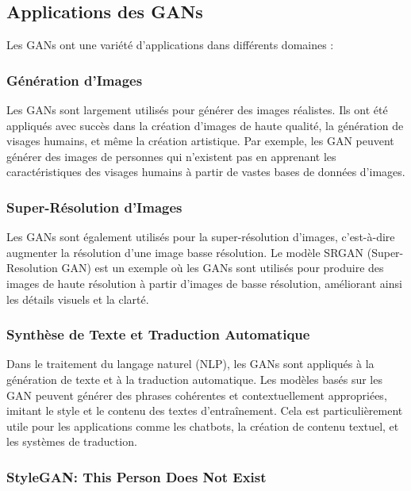 \subsection{Applications des GANs}

Les GANs ont une variété d'applications dans différents domaines :

\subsubsection{Génération d'Images}

Les GANs sont largement utilisés pour générer des images réalistes. Ils ont été
appliqués avec succès dans la création d'images de haute qualité, la génération
de visages humains, et même la création artistique. Par exemple, les GAN
peuvent générer des images de personnes qui n'existent pas en apprenant les
caractéristiques des visages humains à partir de vastes bases de données
d'images.

\subsubsection{Super-Résolution d'Images}

Les GANs sont également utilisés pour la super-résolution d'images,
c'est-à-dire augmenter la résolution d'une image basse résolution. Le modèle
SRGAN (Super-Resolution GAN) est un exemple où les GANs sont utilisés pour
produire des images de haute résolution à partir d'images de basse résolution,
améliorant ainsi les détails visuels et la clarté.

\subsubsection{Synthèse de Texte et Traduction Automatique}

Dans le traitement du langage naturel (NLP), les GANs sont appliqués à la
génération de texte et à la traduction automatique. Les modèles basés sur les
GAN peuvent générer des phrases cohérentes et contextuellement appropriées,
imitant le style et le contenu des textes d'entraînement. Cela est
particulièrement utile pour les applications comme les chatbots, la création de
contenu textuel, et les systèmes de traduction.

\subsubsection{ StyleGAN: This Person Does Not Exist}


